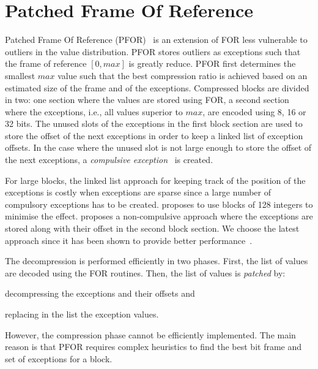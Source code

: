 \section{Patched Frame Of Reference}

Patched Frame Of Reference (PFOR)~\cite{Nzukowski:2006:pfor} is an extension of
FOR less vulnerable to outliers in the value distribution. PFOR stores
outliers as exceptions such that the frame of reference $[0, max]$ is greatly
reduce. PFOR first determines the smallest $max$ value such that the best
compression ratio is achieved based on an estimated size of the frame and of
the exceptions. Compressed blocks are divided in two: one section where the
values are stored using FOR, a second section where the exceptions, i.e., all
values superior to $max$, are encoded using 8, 16 or 32 bits. The unused slots
of the exceptions in the first block section are used to store the offset of
the next exceptions in order to keep a linked list of exception offsets. In
the case where the unused slot is not large enough to store the offset of the
next exceptions, a \emph{compulsive exception}~\cite{Nzukowski:2006:pfor} is
created.

For large blocks, the linked list approach for keeping track of the position
of the exceptions is costly when exceptions are sparse since a large number of
compulsory exceptions has to be created. \cite{Nzukowski:2006:pfor} proposes
to use blocks of 128 integers to minimise the effect. \cite{yan:2009:www}
proposes a non-compulsive approach where the exceptions are stored along with
their offset in the second block section. We choose the latest approach since
it has been shown to provide better performance~\cite{yan:2009:www}.

The decompression is performed efficiently in two phases. First, the list of
values are decoded using the FOR routines. Then, the list of values is
\emph{patched} by:
\begin{inparaenum}
\item decompressing the exceptions and their offsets and 
\item replacing in the list the exception values.
\end{inparaenum}
However, the compression phase cannot be efficiently implemented. The main
reason is that PFOR requires complex heuristics to find the best bit frame and
set of exceptions for a block.
